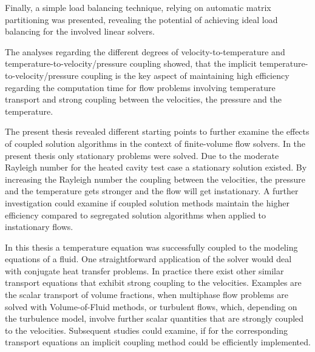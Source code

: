 Finally, a simple load balancing technique, relying on automatic matrix partitioning was presented, revealing the potential of achieving ideal load balancing for the involved linear solvers.

The analyses regarding the different degrees of velocity-to-temperature and temperature-to-velocity/pressure coupling showed, that the implicit temperature-to-velocity/pressure coupling is the key aspect of maintaining high efficiency regarding the computation time for flow problems involving temperature transport and strong coupling between the velocities, the pressure and the temperature.

The present thesis revealed different starting points to further examine the effects of coupled solution algorithms in the context of finite-volume flow solvers. In the present thesis only stationary problems were solved. Due to the moderate Rayleigh number for the heated cavity test case a stationary solution existed. By increasing the Rayleigh number the coupling between the velocities, the pressure and the temperature gets stronger and the flow will get instationary. A further investigation could examine if coupled solution methods maintain the higher efficiency compared to segregated solution algorithms when applied to instationary flows.

In this thesis a temperature equation was successfully coupled to the modeling equations of a fluid. One straightforward application of the solver would deal with conjugate heat transfer problems. In practice there exist other similar transport equations that exhibit strong coupling to the velocities. Examples are the scalar transport of volume fractions, when multiphase flow problems are solved with Volume-of-Fluid methods, or turbulent flows, which, depending on the turbulence model, involve further scalar quantities that are strongly coupled to the velocities. Subsequent studies could examine, if for the corresponding transport equations an implicit coupling method could be efficiently implemented.


